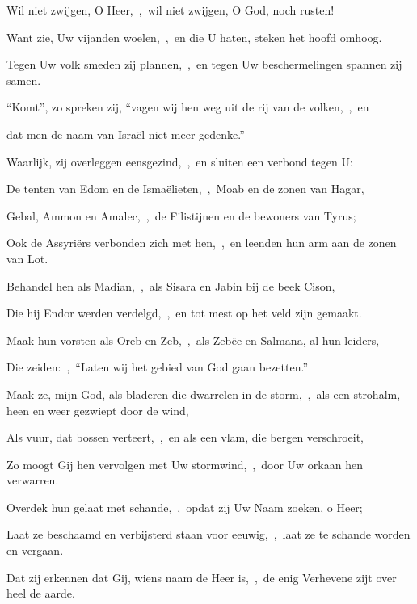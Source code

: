 \documentclass[12pt,twoside,a5paper]{article}
\begin{document}
\begin{halfparskip}
  Wil niet zwijgen, O Heer,~\sep\ wil niet zwijgen, O God, noch rusten!


  Want zie, Uw vijanden woelen,~\sep\ en die U haten, steken het hoofd omhoog.

  Tegen Uw volk smeden zij plannen,~\sep\ en tegen Uw beschermelingen spannen zij samen.

  ``Komt'', zo spreken zij, ``vagen wij hen weg uit de rij van de volken,~\sep\ en

  dat men de naam van Israël niet meer gedenke.''

  Waarlijk, zij overleggen eensgezind,~\sep\ en sluiten een verbond tegen U:

  De tenten van Edom en de Ismaëlieten,~\sep\ Moab en de zonen van Hagar,

  Gebal, Ammon en Amalec,~\sep\ de Filistijnen en de bewoners van Tyrus;

  Ook de Assyriërs verbonden zich met hen,~\sep\ en leenden hun arm aan de zonen van Lot.
\end{halfparskip}


\begin{halfparskip}
  Behandel hen als Madian,~\sep\ als Sisara en Jabin bij de beek Cison,

  Die hij Endor werden verdelgd,~\sep\ en tot mest op het veld zijn gemaakt.

  Maak hun vorsten als Oreb en Zeb,~\sep\ als Zebëe en Salmana, al hun leiders,

  Die zeiden:~\sep\ ``Laten wij het gebied van God gaan bezetten.''

  Maak ze, mijn God, als bladeren die dwarrelen in de storm,~\sep\ als een strohalm, heen en weer gezwiept door de wind,

  Als vuur, dat bossen verteert,~\sep\ en als een vlam, die bergen verschroeit,

  Zo moogt Gij hen vervolgen met Uw stormwind,~\sep\ door Uw orkaan hen verwarren.

  Overdek hun gelaat met schande,~\sep\ opdat zij Uw Naam zoeken, o Heer;

  Laat ze beschaamd en verbijsterd staan voor eeuwig,~\sep\ laat ze te schande worden en vergaan.

  Dat zij erkennen dat Gij, wiens naam de Heer is,~\sep\ de enig Verhevene zijt over heel de aarde.
\end{halfparskip}
\end{document}
